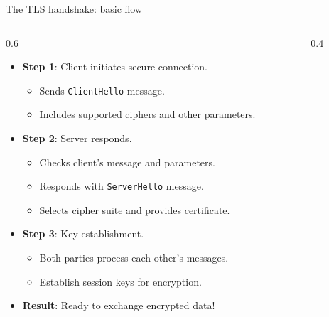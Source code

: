 \ifdefined\PRESENTATION\else\PassOptionsToClass{handout}{beamer}\fi\documentclass[aspectratio=169, lualatex]{beamer}
\begin{document}
\begin{frame}{The TLS handshake: basic flow}
	\begin{columns}[c]
		\begin{column}{0.6\textwidth}
			\begin{itemize}[<+->]
				\item \textbf{Step 1}: Client initiates secure connection.
				      \begin{itemize}
					      \item Sends \texttt{ClientHello} message.
					      \item Includes supported ciphers and other parameters.
				      \end{itemize}
				\item \textbf{Step 2}: Server responds.
				      \begin{itemize}
					      \item Checks client's message and parameters.
					      \item Responds with \texttt{ServerHello} message.
					      \item Selects cipher suite and provides certificate.
				      \end{itemize}
				\item \textbf{Step 3}: Key establishment.
				      \begin{itemize}
					      \item Both parties process each other's messages.
					      \item Establish session keys for encryption.
				      \end{itemize}
				\item \textbf{Result}: Ready to exchange encrypted data!
			\end{itemize}
		\end{column}
		\begin{column}{0.4\textwidth}
		\end{column}
	\end{columns}
\end{frame}
\end{document}
